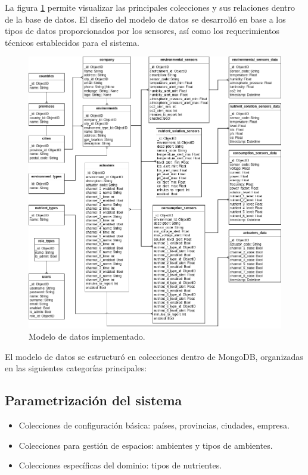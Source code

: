 
La figura \ref{fig:modelo de datos} permite visualizar las principales
colecciones y sus relaciones dentro de la base de datos. El diseño del modelo
de datos se desarrolló en base a los tipos de datos proporcionados por los
sensores, así como los requerimientos técnicos establecidos para el sistema.

\begin{figure}[H]
    \centering
    \includegraphics[width=.99\textwidth]{./Images/15.png}
    \caption{Modelo de datos implementado.}
    \label{fig:modelo de datos}
\end{figure}

El modelo de datos se estructuró en colecciones dentro de MongoDB, organizadas
en las siguientes categorías principales:

\subsection{Parametrización del sistema}

\begin{itemize}
    \item Colecciones de configuración básica: países, provincias, ciudades, empresa.
    \item Colecciones para gestión de espacios: ambientes y tipos de ambientes.
    \item Colecciones específicas del dominio: tipos de nutrientes.
\end{itemize}

